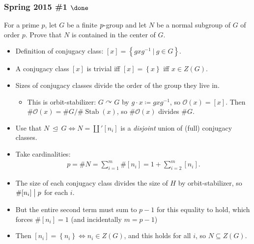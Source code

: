 \hypertarget{spring-2015-1-done}{%
\subsubsection{\texorpdfstring{Spring 2015 \#1
\(\done\)}{Spring 2015 \#1 \textbackslash done}}\label{spring-2015-1-done}}

For a prime \(p\), let \(G\) be a finite \(p{\hbox{-}}\)group and let
\(N\) be a normal subgroup of \(G\) of order \(p\). Prove that \(N\) is
contained in the center of \(G\).

\begin{concept}

\envlist

\begin{itemize}
\tightlist
\item
  Definition of conjugacy class:
  \([x] = \left\{{gxg^{-1}{~\mathrel{\Big|}~}g\in G}\right\}\).
\item
  A conjugacy class \([x]\) is trivial iff
  \([x] = \left\{{ x }\right\}\) iff \(x\in Z(G)\).
\item
  Sizes of conjugacy classes divide the order of the group they live in.

  \begin{itemize}
  \tightlist
  \item
    This is orbit-stabilizer: \(G\curvearrowright G\) by
    \(g\cdot x \coloneqq gxg^{-1}\), so \({\mathcal{O}}(x) = [x]\). Then
    \(\# {\mathcal{O}}(x) = \# G / \# {\operatorname{Stab}}(x)\), so
    \(\# {\mathcal{O}}(x)\) divides \(\# G\).
  \end{itemize}
\end{itemize}

\end{concept}

\begin{solution}

\envlist

\begin{itemize}
\tightlist
\item
  Use that \(N{~\trianglelefteq~}G \iff N = {\textstyle\coprod}' [n_i]\)
  is a \emph{disjoint} union of (full) conjugacy classes.
\item
  Take cardinalities:
  \begin{align*}
  p = \# N = \sum_{i=1}^m \# [n_i] = 1 + \sum_{i=2}^m [n_i]
  .\end{align*}
\item
  The size of each conjugacy class divides the size of \(H\) by
  orbit-stabilizer, so \(\# [n_i] \bigm|p\) for each \(i\).
\item
  But the entire second term must sum to \(p-1\) for this equality to
  hold, which forces \(\#[n_i] = 1\) (and incidentally \(m=p-1\))
\item
  Then \([n_i] = \left\{{ n_i }\right\} \iff n_i \in Z(G)\), and this
  holds for all \(i\), so \(N \subseteq Z(G)\).
\end{itemize}

\end{solution}

